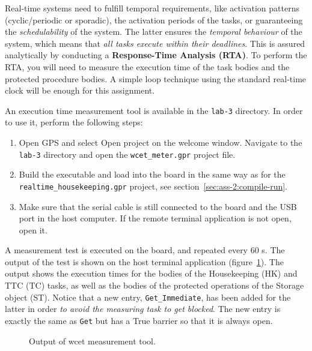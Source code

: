 Real-time systems need to fulfill temporal requirements,
like activation patterns (cyclic/periodic or sporadic),
the activation periods of the tasks,
or guaranteeing the \textit{schedulability} of the system.
The latter ensures the \textit{temporal behaviour} of the system,
which means that \textit{all tasks
execute within their deadlines}.
This is assured analytically by conducting a \textbf{Response-Time Analysis (RTA)}.
To perform the RTA, you will need to measure the execution time of the task bodies and the protected procedure bodies.
A simple loop technique using the standard real-time clock will be enough for this assignment.

An execution time measurement tool is available in the \textcolor{mPurple}{\texttt{lab-3}} directory.
In order to use it, perform the following steps:

\begin{enumerate}
\item Open GPS and select Open project on the welcome window. Navigate to the \textcolor{mPurple}{\texttt{lab-3}}
directory and open the \texttt{wcet\_meter.gpr} project file.

\item Build the executable and load into the board in the same way as for the \texttt{realtime\_housekeeping.gpr} project, see section~\ref{sec:ass-2:compile-run}.

\item Make sure that the serial cable is still connected to the board and the USB port in the host
computer. If the remote terminal application is not open, open it.
\end{enumerate}

A measurement test is executed on the board, and repeated every 60 s. The output of the test is shown on the host terminal application (figure~\ref{fig:wcet}). The output shows the execution times for the bodies of the Housekeeping (HK) and TTC (TC) tasks, as well as the bodies of the protected operations of the Storage object (ST). Notice that a new entry, \texttt{Get\_Immediate},
has been added for the latter in order \textit{to avoid the measuring task to get blocked}.
The new entry is exactly the same as \texttt{Get} but has a True barrier so that it is always open.

\begin{figure}[h]
    \caption{Output of wcet measurement tool.}
    \label{fig:wcet}
\end{figure}

